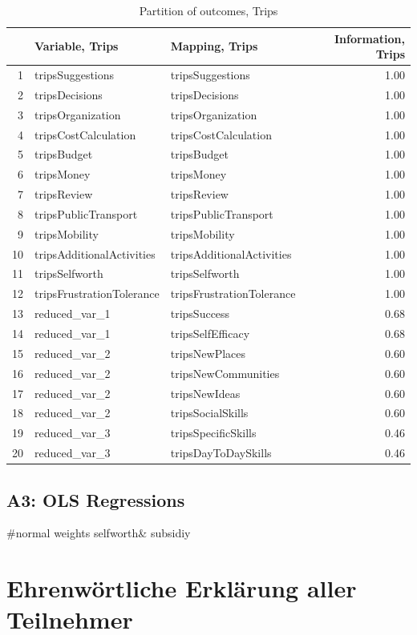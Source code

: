\documentclass[12pt, a4paper, titlepage]{article}\usepackage[]{graphicx}\usepackage[]{color}
\makeatletter
\newenvironment{kframe}{%
 \def\at@end@of@kframe{}%
 \ifinner\ifhmode%
  \def\at@end@of@kframe{\end{minipage}}%
  \begin{minipage}{\columnwidth}%
 \fi\fi%
 \def\FrameCommand##1{\hskip\@totalleftmargin \hskip-\fboxsep
 \colorbox{shadecolor}{##1}\hskip-\fboxsep
     \hskip-\linewidth \hskip-\@totalleftmargin \hskip\columnwidth}%
 \MakeFramed {\advance\hsize-\width
   \@totalleftmargin\z@ \linewidth\hsize
   \@setminipage}}%
 {\par\unskip\endMakeFramed%
 \at@end@of@kframe}
\makeatother
\begin{document}
\begin{table}[ht]
\centering
\begin{tabular}{rllr}
  \hline
 & Variable, Trips & Mapping, Trips & Information, Trips \\ 
  \hline
1 & tripsSuggestions & tripsSuggestions & 1.00 \\ 
  2 & tripsDecisions & tripsDecisions & 1.00 \\ 
  3 & tripsOrganization & tripsOrganization & 1.00 \\ 
  4 & tripsCostCalculation & tripsCostCalculation & 1.00 \\ 
  5 & tripsBudget & tripsBudget & 1.00 \\ 
  6 & tripsMoney & tripsMoney & 1.00 \\ 
  7 & tripsReview & tripsReview & 1.00 \\ 
  8 & tripsPublicTransport & tripsPublicTransport & 1.00 \\ 
  9 & tripsMobility & tripsMobility & 1.00 \\ 
  10 & tripsAdditionalActivities & tripsAdditionalActivities & 1.00 \\ 
  11 & tripsSelfworth & tripsSelfworth & 1.00 \\ 
  12 & tripsFrustrationTolerance & tripsFrustrationTolerance & 1.00 \\ 
  13 & reduced\_var\_1 & tripsSuccess & 0.68 \\ 
  14 & reduced\_var\_1 & tripsSelfEfficacy & 0.68 \\ 
  15 & reduced\_var\_2 & tripsNewPlaces & 0.60 \\ 
  16 & reduced\_var\_2 & tripsNewCommunities & 0.60 \\ 
  17 & reduced\_var\_2 & tripsNewIdeas & 0.60 \\ 
  18 & reduced\_var\_2 & tripsSocialSkills & 0.60 \\ 
  19 & reduced\_var\_3 & tripsSpecificSkills & 0.46 \\ 
  20 & reduced\_var\_3 & tripsDayToDaySkills & 0.46 \\ 
   \hline
\end{tabular}
\caption{Partition of outcomes, Trips} 
\end{table}
\begin{kframe}

{\ttfamily\noindent\bfseries\color{errorcolor}{\#\# Error in print.default(m, ..., quote = quote, right = right, max = max): invalid 'digits' argument}}\end{kframe}
\subsection{A3: OLS Regressions}

#normal weights selfworth& subsidiy


\begin{kframe}


{\ttfamily\noindent\bfseries{}}\end{kframe}

\section{Ehrenwörtliche Erklärung aller Teilnehmer}
\end{document}
